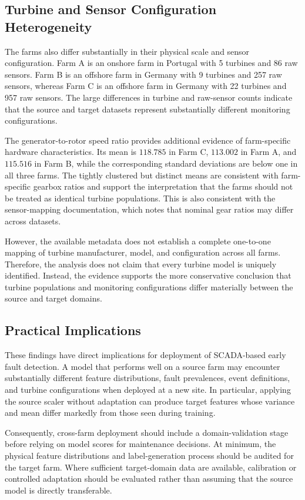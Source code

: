 \documentclass[conference]{IEEEtran}
\begin{document}
\subsection{Turbine and Sensor Configuration Heterogeneity}

The farms also differ substantially in their physical scale and sensor
configuration. Farm A is an onshore farm in Portugal with 5 turbines and
86 raw sensors. Farm B is an offshore farm in Germany with 9 turbines and
257 raw sensors, whereas Farm C is an offshore farm in Germany with 22
turbines and 957 raw sensors. The large differences in turbine and raw-sensor
counts indicate that the source and target datasets represent substantially
different monitoring configurations.

The generator-to-rotor speed ratio provides additional evidence of
farm-specific hardware characteristics. Its mean is $118.785$ in Farm C,
$113.002$ in Farm A, and $115.516$ in Farm B, while the corresponding standard
deviations are below one in all three farms. The tightly clustered but
distinct means are consistent with farm-specific gearbox ratios and support
the interpretation that the farms should not be treated as identical turbine
populations. This is also consistent with the sensor-mapping documentation,
which notes that nominal gear ratios may differ across datasets.

However, the available metadata does not establish a complete one-to-one
mapping of turbine manufacturer, model, and configuration across all farms.
Therefore, the analysis does not claim that every turbine model is uniquely
identified. Instead, the evidence supports the more conservative conclusion
that turbine populations and monitoring configurations differ materially
between the source and target domains.

\subsection{Practical Implications}

These findings have direct implications for deployment of SCADA-based early
fault detection. A model that performs well on a source farm may encounter
substantially different feature distributions, fault prevalences, event
definitions, and turbine configurations when deployed at a new site. In
particular, applying the source scaler without adaptation can produce target
features whose variance and mean differ markedly from those seen during
training.

Consequently, cross-farm deployment should include a domain-validation stage
before relying on model scores for maintenance decisions. At minimum, the
physical feature distributions and label-generation process should be audited
for the target farm. Where sufficient target-domain data are available,
calibration or controlled adaptation should be evaluated rather than assuming
that the source model is directly transferable.
\end{document}

